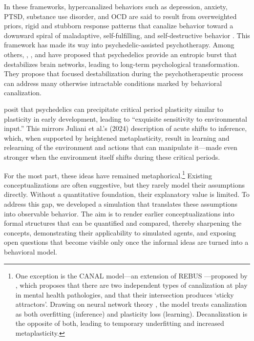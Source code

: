 In these frameworks, hypercanalized behaviors such as depression, anxiety, PTSD, substance use disorder, and OCD are said to result from overweighted priors, rigid and stubborn response patterns that canalize behavior toward a downward spiral of maladaptive, self-fulfilling, and self-destructive behavior \cite{scheffer_dynamical_2024}. This framework has made its way into psychedelic-assisted psychotherapy. Among others, \cite{carhart-harris_entropic_2014}, \cite{hipolito_pattern_2023}, and \cite{girn_complex_2023} have proposed that psychedelics provide an entropic burst that destabilizes brain networks, leading to long-term psychological transformation. They propose that focused destabilization during the psychotherapeutic process can address many otherwise intractable conditions marked by behavioral canalization.

\cite{lepow_critical_2021} posit that psychedelics can precipitate critical period plasticity similar to plasticity in early development, leading to “exquisite sensitivity to environmental input.” This mirrors Juliani et al.'s (2024) description of acute shifts to inference, which, when supported by heightened metaplasticity, result in learning and relearning of the environment and actions that can manipulate it—made even stronger when the environment itself shifts during these critical periods.

For the most part, these ideas have remained metaphorical.\footnote{One exception is the CANAL model—an extension of REBUS \cite{carhart-harris_rebus_2019}—proposed by \cite{juliani_deep_2024}, which proposes that there are two independent types of canalization at play in mental health pathologies, and that their intersection produces ‘sticky attractors’. Drawing on neural network theory \cite{barak_recurrent_2017}, the model treats canalization as both overfitting (inference) and plasticity loss (learning). Decanalization is the opposite of both, leading to temporary underfitting and increased metaplasticity.} Existing conceptualizations are often suggestive, but they rarely model their assumptions directly. Without a quantitative foundation, their explanatory value is limited. To address this gap, we developed a simulation that translates these assumptions into observable behavior. The aim is to render earlier conceptualizations into formal structures that can be quantified and compared, thereby sharpening the concepts, demonstrating their applicability to simulated agents, and exposing open questions that become visible only once the informal ideas are turned into a behavioral model.

